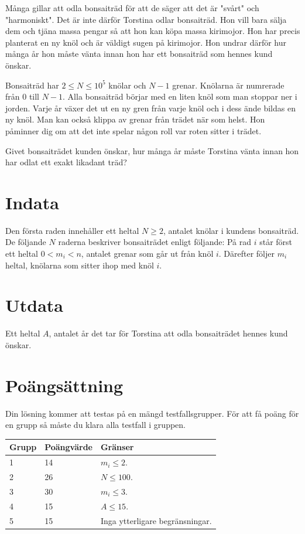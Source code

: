 Många gillar att odla bonsaiträd för att de säger att det är "svårt" och "harmoniskt". Det är inte därför Torstina odlar bonsaiträd. Hon vill bara sälja dem och tjäna massa pengar så att hon kan köpa massa kirimojor. Hon har precis planterat en ny knöl och är väldigt sugen på kirimojor. Hon undrar därför hur många år hon måste vänta innan hon har ett bonsaiträd som hennes kund önskar.

Bonsaiträd har $2\leq N \leq 10^5$ knölar och $N-1$ grenar. Knölarna är numrerade från 0 till $N-1$. Alla bonsaiträd börjar med en liten knöl som man stoppar ner i jorden. Varje år växer det ut en ny gren från varje knöl och i dess ände bildas en ny knöl. Man kan också klippa av grenar från trädet när som helst. Hon påminner dig om att det inte spelar någon roll var roten sitter i trädet. 

Givet bonsaiträdet kunden önskar, hur många år måste Torstina vänta innan hon har odlat ett exakt likadant träd?

\section*{Indata}
Den första raden innehåller ett heltal $N\geq 2$, antalet knölar i kundens bonsaiträd.
De följande $N$ raderna beskriver bonsaiträdet enligt följande:
På rad $i$ står först ett heltal $0 < m_i < n$, antalet grenar som går ut från knöl $i$. Därefter följer $m_i$ heltal, knölarna som sitter ihop med knöl $i$. 

\section*{Utdata}
Ett heltal $A$, antalet år det tar för Torstina att odla bonsaiträdet hennes kund önskar.

\section*{Poängsättning}
Din lösning kommer att testas på en mängd testfallsgrupper.
För att få poäng för en grupp så måste du klara alla testfall i gruppen.

\noindent
\begin{tabular}{| l | l | l |}
\hline
Grupp & Poängvärde & Gränser \\ \hline
1     & 14         &  $m_i\leq 2$.\\ \hline
2     & 26         &  $N \leq 100$. \\ \hline
3     & 30         &  $m_i \leq 3$. \\ \hline
4     & 15          &  $A \leq 15$. \\ \hline
5     & 15          &  Inga ytterligare begränsningar. \\ \hline
\end{tabular}

